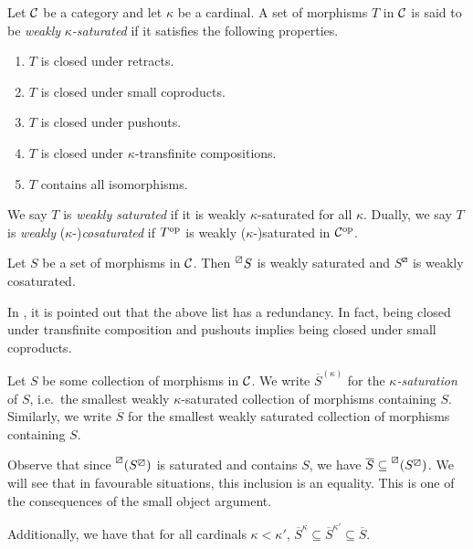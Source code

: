 \begin{definition}
	Let \(\mathcal{C}\) be a category and let \(\kappa\) be a cardinal. A set of morphisms \(T\) in \(\mathcal{C}\) is said to be \emph{weakly} \(\kappa\)\emph{-saturated} if it satisfies the following
	properties.
	\begin{enumerate}[label=(\arabic*)]
		\item \(T\) is closed under retracts.
		\item \(T\) is closed under small coproducts.
		\item \(T\) is closed under pushouts.
		\item \(T\) is closed under \(\kappa\)-transfinite compositions.
		\item \(T\) contains all isomorphisms.
	\end{enumerate}
	We say \(T\) is \emph{weakly saturated} if it is weakly \(\kappa\)-saturated for all \(\kappa\). Dually, we say \(T\) is \emph{weakly} (\(\kappa\)-)\emph{cosaturated} if \(T^{\mathrm{op}}\)
	is weakly (\(\kappa\)-)saturated in \(\mathcal{C}^{\mathrm{op}}\).
\end{definition}
\begin{corollary}\label{corollary:llp-weakly-saturated}
	Let \(S\) be a set of morphisms in \(\mathcal{C}\). Then \(\prescript{\boxslash}{}{S}\) is weakly saturated and \(S^\boxslash\) is weakly cosaturated.
\end{corollary}
\begin{remark}
	In \cite[Remark 2.1.3]{cisinski-book}, it is pointed out that the above list has a redundancy. In fact, being closed under transfinite composition and pushouts implies being
	closed under small coproducts.
\end{remark}

\begin{notation}
	Let \(S\) be some collection of morphisms in \(\mathcal{C}\). We write \(\overline{S}^{(\kappa)}\) for the \(\kappa\)\emph{-saturation} of \(S\), i.e.\ the smallest
	weakly \(\kappa\)-saturated collection of morphisms containing \(S\). Similarly, we write \(\overline{S}\) for the smallest weakly saturated collection of morphisms containing \(S\).
\end{notation}
\begin{remark}\label{remark:saturation-inclusions}
	Observe that since \(\prescript{\boxslash}{}{(S^\boxslash)}\) is saturated and contains \(S\), we have \(\overline{S} \subseteq \prescript{\boxslash}{}{(S^\boxslash)}\). We will
	see that in favourable situations, this inclusion is an equality. This is one of the consequences of the small object argument.
	
	Additionally, we have that for all cardinals \(\kappa < \kappa'\), \(\overline{S}^{\kappa} \subseteq \overline{S}^{\kappa'} \subseteq \overline{S}\).
\end{remark}

